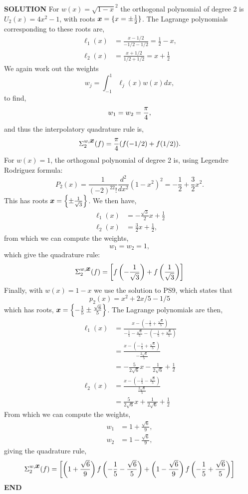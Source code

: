 \documentclass[12pt,a4paper]{article}
\def\x{ {\vc x} }
\begin{document}
\textbf{SOLUTION} For $w(x) = \sqrt{1-x}^2$ the orthogonal polynomial of degree 2 is $U_2(x) = 4x^2 -1$, with roots $\ensuremath{\bm{\x}} = \{x = \ensuremath{\pm} \frac{1}{2}\}$. The Lagrange polynomials corresponding to these roots are,
\begin{align*}
\ensuremath{\ell}_1(x) &= \frac{x - 1/2}{-1/2 - 1/2} = \frac{1}{2} - x, \\
\ensuremath{\ell}_2(x) &= \frac{x + 1/2}{1/2 + 1/2} = x + \frac{1}{2}
\end{align*}
We again work out the weights
\[
w_j = \int_{-1}^1 \ensuremath{\ell}_j(x)w(x)dx,
\]
to find,
\[
w_1 = w_2 = {\ensuremath{\pi} \over 4},
\]
and thus the interpolatory quadrature rule is,
\[
\ensuremath{\Sigma}_2^{w,\ensuremath{\bm{\x}}}(f) = \frac{\ensuremath{\pi}}{4}(f(-1/2) + f(1/2)).
\]
For $w(x) = 1$, the orthogonal polynomial of degree 2 is, using Legendre Rodriguez formula:
\[
P_2(x) = \frac{1}{(-2)^22!} \frac{d^2}{dx^2}\left(1 - x^2\right)^2 = -\frac{1}{2} + \frac{3}{2}x^2.
\]
This has roots $\ensuremath{\bm{\x}} = \left\{\ensuremath{\pm} \frac{1}{\sqrt{3}}\right\}$. We then have,
\begin{align*}
	\ensuremath{\ell}_1(x) &= -\frac{\sqrt{3}}{2}x + \frac{1}{2} \\
	\ensuremath{\ell}_2(x) &= \frac{3}{2}x + \frac{1}{2},
\end{align*}
from which we can compute the weights,
\[
w_1 = w_2 = 1,
\]
which give the quadrature rule:
\[
\ensuremath{\Sigma}_2^{w,\ensuremath{\bm{\x}}}(f) = \left[f\left(-\frac{1}{\sqrt{3}}\right) + f\left(\frac{1}{\sqrt{3}}\right)\right]
\]
Finally, with $w(x) = 1 - x$ we use the solution to PS9, which states that
\[
p_2(x) = x^2 + 2x/5 - 1/5
\]
which has roots, $\ensuremath{\bm{\x}} = \left\{-\frac{1}{5} \ensuremath{\pm} \frac{\sqrt{6}}{5} \right\}$. The Lagrange polynomials are then,
\begin{align*}
	\ensuremath{\ell}_1(x) &= \frac{x - (-\frac{1}{5} + \frac{\sqrt{6}}{5} )}{-\frac{1}{5} - \frac{\sqrt{6}}{5} - (-\frac{1}{5} + \frac{\sqrt{6}}{5}) } \\
	&= \frac{x - (-\frac{1}{5} + \frac{\sqrt{6}}{5} )}{-\frac{2\sqrt{6}}{5}} \\
	&=-\frac{5}{2\sqrt{6}}x - \frac{1}{2\sqrt{6}} + \frac{1}{2} \\
	\ensuremath{\ell}_2(x) &= \frac{x - (-\frac{1}{5} - \frac{\sqrt{6}}{5} )}{\frac{2\sqrt{6}}{5}} \\
	&= \frac{5}{2\sqrt{6}}x + \frac{1}{2\sqrt{6}} + \frac{1}{2}
\end{align*}
From which we can compute the weights,
\begin{align*}
	w_1 &= 1 + \frac{\sqrt{6}}{9}, \\
	w_2 &= 1 - \frac{\sqrt{6}}{9},
\end{align*}
giving the quadrature rule,
\[
\ensuremath{\Sigma}_2^{w,\ensuremath{\bm{\x}}}(f) = \left[\left(1 + \frac{\sqrt{6}}{9} \right)f\left(-\frac{1}{5} - \frac{\sqrt{6}}{5} \right) + \left(1 - \frac{\sqrt{6}}{9} \right)f\left(-\frac{1}{5} + \frac{\sqrt{6}}{5} \right) \right]
\]
\textbf{END}
\end{document}
